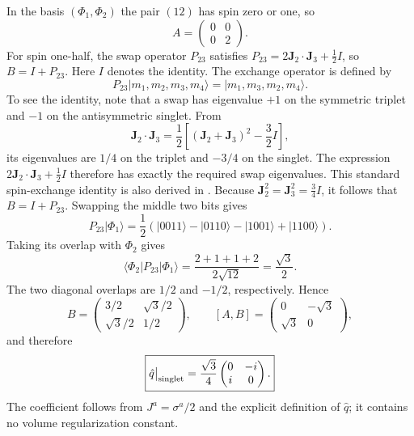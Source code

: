 In the basis $(\Phi_1,\Phi_2)$ the pair $(12)$ has spin zero or one, so
\begin{equation}
 A=\begin{pmatrix}0&0\\0&2\end{pmatrix}.
\end{equation}
For spin one-half, the swap operator $P_{23}$ satisfies
$P_{23}=2\mathbf J_2\cdot\mathbf J_3+\tfrac12 I$, so
$B=I+P_{23}$. Here $I$ denotes the identity. The exchange operator is defined by
\begin{equation}
 P_{23}|m_1,m_2,m_3,m_4\rangle=|m_1,m_3,m_2,m_4\rangle.
\end{equation}
To see the identity, note that a swap has eigenvalue $+1$ on the symmetric
triplet and $-1$ on the antisymmetric singlet. From
\begin{equation}
 \mathbf J_2\cdot\mathbf J_3
 =\frac12\left[(\mathbf J_2+\mathbf J_3)^2-\frac32 I\right],
\end{equation}
its eigenvalues are $1/4$ on the triplet and $-3/4$ on the singlet.
The expression $2\mathbf J_2\cdot\mathbf J_3+\tfrac12 I$ therefore has
exactly the required swap eigenvalues. This standard spin-exchange identity
is also derived in \cite{YuSpinExchange}. Because
$\mathbf J_2^2=\mathbf J_3^2=\tfrac34 I$, it follows that $B=I+P_{23}$.
Swapping the middle two bits gives
\begin{equation}
 P_{23}|\Phi_1\rangle
 =\frac12(|0011\rangle-|0110\rangle-|1001\rangle+|1100\rangle).
\end{equation}
Taking its overlap with $\Phi_2$ gives
\begin{equation}
 \langle\Phi_2|P_{23}|\Phi_1\rangle
 =\frac{2+1+1+2}{2\sqrt{12}}=\frac{\sqrt3}{2}.
\end{equation}
The two diagonal overlaps are $1/2$ and $-1/2$, respectively. Hence
\begin{equation}
 B=\begin{pmatrix}3/2&\sqrt3/2\\\sqrt3/2&1/2\end{pmatrix},
 \qquad [A,B]=\begin{pmatrix}0&-\sqrt3\\\sqrt3&0\end{pmatrix},
\end{equation}
and therefore
\begin{equation}\label{eqn:q-matrix-result}
 \boxed{\hat q\big|_{\rm singlet}
 =\frac{\sqrt3}{4}\begin{pmatrix}0&-i\\i&0\end{pmatrix}.}
\end{equation}
The coefficient follows from $J^a=\sigma^a/2$ and the explicit definition
of $\hat q$; it contains no volume regularization constant.

